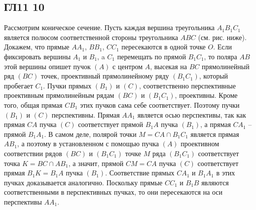 \subsection*{ГЛ11 10}
Рассмотрим коническое сечение. Пусть каждая вершина треугольника $A_1B_1C_1$ является полюсом соответственной стороны треугольника $ABC$ (см. рис. ниже). Докажем, что прямые $AA_1$, $BB_1$, $CC_1$ пересекаются в одной точке $O$. Если фиксировать вершины $A_1$ и $B_1$, a $C_1$ перемещать по прямой $B_1C_1$, то поляра $AB$ этой вершины опишет пучок $(A)$ с центром $A$, высекая на $BC$ прямолинейный ряд $(BC)$ точек, проективный прямолинейному ряду $(B_1C_1)$, который пробегает $C_1$. Пучки прямых $(B_1)$ и $(C)$, соответственно перспективные проективным прямолинейным рядам $(BC)$ и $(B_1C_1)$, проективны. Кроме того, общая прямая $CB_1$ этих пучков сама себе соответствует. Поэтому пучки $(B_1)$ и $(C)$ перспективны. Прямая $AA_1$ является осью перспективы, так как прямая $CA$ пучка $(C)$ соответствует прямой $B_1A$ пучка $(B_1)$, а прямая $CA_1$ -- прямой $B_1A_1$. В самом деле, полярой точки $M = CA \cap B_1C_1$ является прямая $AB_1$, а поэтому в установленном с помощью пучка $(A)$ проективном соответствии рядов $(BC)$ и $(B_1C_1)$ точке $M$ ряда $(B_1C_1)$ соответствует точка $K = BC \cap AB_1$, а значит, прямой $CM = CA$ пучка $(C)$ соответствует прямая $B_1K = B_1A$ пучка $(B_1)$. Соответствие прямых $CA_1$ и $B_1A_1$ в этих пучках доказывается аналогично. Поскольку прямые $CC_1$ и $B_1B$ являются соответственными в перспективных пучках, то они пересекаются на оси перспективы $AA_1$.
		